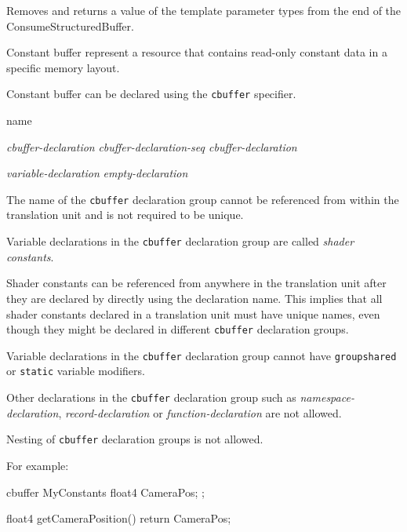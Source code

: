 Removes and returns a value of the template parameter types from the end of the ConsumeStructuredBuffer.


Constant buffer represent a resource that contains read-only constant data in a specific memory layout.


\p Constant buffer can be declared using the \texttt{cbuffer} specifier.

\begin{grammar}
  \br
   name  \terminal{\{}
   \terminal {\}}

  \br
  \textit{cbuffer-declaration}\br
  \textit{cbuffer-declaration-seq cbuffer-declaration}

  \br
  \textit{variable-declaration}\br
  \textit{empty-declaration}
\end{grammar}

\p The name of the \texttt{cbuffer} declaration group cannot be referenced from within the translation unit and is not required to be unique.

\p Variable declarations in the \texttt{cbuffer} declaration group are called \textit{shader constants}.

\p Shader constants can be referenced from anywhere in the translation unit after they are declared by directly using the declaration name. This implies that all shader constants declared in a translation unit must have unique names, even though they might be declared in different \texttt{cbuffer} declaration groups.

\p Variable declarations in the \texttt{cbuffer} declaration group cannot have \texttt{groupshared} or \texttt{static} variable modifiers.

\p Other declarations in the \texttt{cbuffer} declaration group such as
\textit{namespace-declaration}, \textit{record-declaration} or
\textit{function-declaration} are not allowed.

\p Nesting of \texttt{cbuffer} declaration groups is not allowed.

\p For example:

\begin{HLSL}
  cbuffer MyConstants {
    float4 CameraPos;
  };

  float4 getCameraPosition() {
    return CameraPos;
  }
\end{HLSL}

